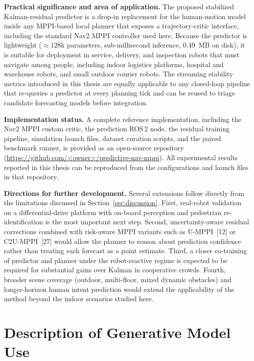 \documentclass[12pt, a4paper]{article}
\begin{document}
\textbf{Practical significance and area of application.} The proposed stabilized Kalman-residual predictor is a drop-in replacement for the human-motion model inside any MPPI-based local planner that exposes a trajectory-critic interface, including the standard Nav2 MPPI controller used here. Because the predictor is lightweight ($\approx 128$k parameters, sub-millisecond inference, $0.49$~MB on disk), it is suitable for deployment in service, delivery, and inspection robots that must navigate among people, including indoor logistics platforms, hospital and warehouse robots, and small outdoor courier robots. The streaming stability metrics introduced in this thesis are equally applicable to any closed-loop pipeline that re-queries a predictor at every planning tick and can be reused to triage candidate forecasting models before integration.

\textbf{Implementation status.} A complete reference implementation, including the Nav2 MPPI custom critic, the prediction ROS\,2 node, the residual training pipeline, simulation launch files, dataset curation scripts, and the paired benchmark runner, is provided as an open-source repository (\url{https://github.com/<owner>/predictive-nav-mppi}). All experimental results reported in this thesis can be reproduced from the configurations and launch files in that repository.

\textbf{Directions for further development.} Several extensions follow directly from the limitations discussed in Section~\ref{sec:discussion}. First, real-robot validation on a differential-drive platform with on-board perception and pedestrian re-identification is the most important next step. Second, uncertainty-aware residual corrections combined with risk-aware MPPI variants such as U-MPPI~[12] or C2U-MPPI~[27] would allow the planner to reason about prediction confidence rather than treating each forecast as a point estimate. Third, a closer co-training of predictor and planner under the robot-reactive regime is expected to be required for substantial gains over Kalman in cooperative crowds. Fourth, broader scene coverage (outdoor, multi-floor, mixed dynamic obstacles) and longer-horizon human intent prediction would extend the applicability of the method beyond the indoor scenarios studied here.

\newpage
\section*{Description of Generative Model Use}
\end{document}
